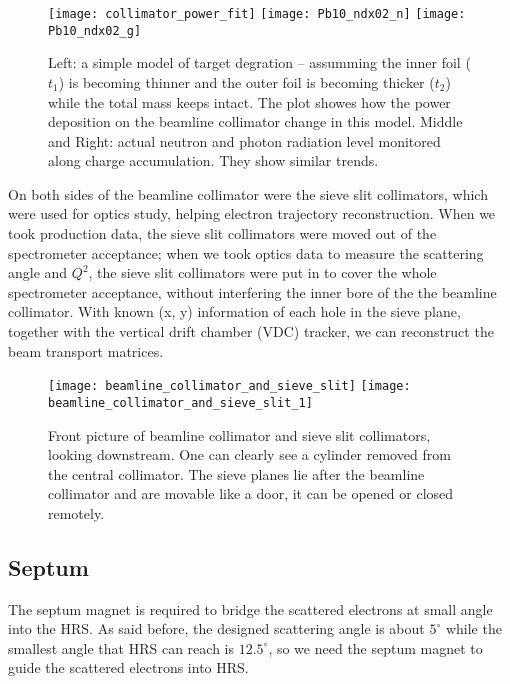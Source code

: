 \begin{figure}[h!]
    \texttt{[image: collimator\_power\_fit]}
    \texttt{[image: Pb10\_ndx02\_n]}
    \texttt{[image: Pb10\_ndx02\_g]}
    \caption{Left: a simple model of target degration -- assumming the inner 
    foil ($t_1$) is becoming thinner and the outer foil is becoming thicker ($t_2$) 
    while the total mass keeps intact. The plot showes how the power deposition 
    on the beamline collimator change in this model. Middle and Right: actual
    neutron and photon radiation level monitored along charge accumulation. They
    show similar trends.}
    \label{fig:collimator_see_target_degration}
\end{figure}

On both sides of the beamline collimator were the sieve slit collimators, which
were used for optics study, helping electron trajectory reconstruction. When
we took production data, the sieve slit collimators were moved out of the spectrometer
acceptance; when we took optics data to measure the scattering angle and $Q^2$,
the sieve slit collimators were put in to cover the whole spectrometer acceptance,
without interfering the inner bore of the the beamline collimator. With known
(x, y) information of each hole in the sieve plane, together with the vertical
drift chamber (VDC) tracker, we can reconstruct the beam transport matrices.
\begin{figure}[h!]
    \centering
    \texttt{[image: beamline\_collimator\_and\_sieve\_slit]}
    \hspace{1cm}
    \texttt{[image: beamline\_collimator\_and\_sieve\_slit\_1]}
    \caption{Front picture of beamline collimator and sieve slit collimators, looking 
    downstream. One can clearly see a cylinder removed from the central collimator.
    The sieve planes lie after the beamline collimator and are movable like
    a door, it can be opened or closed remotely.}
\end{figure}

\subsection{Septum}
The septum magnet is required to bridge the scattered electrons at small angle
into the HRS. As said before, the designed scattering angle is about $5^\circ$
while the smallest angle that HRS can reach is $12.5^\circ$, so we need the septum
magnet to guide the scattered electrons into HRS. 

